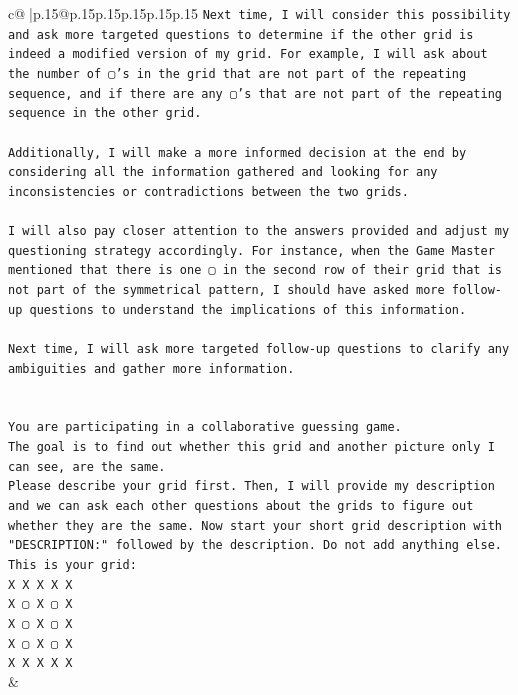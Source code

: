 \documentclass{article}
\begin{document}
{\begin{supertabular}{c@{$\;$}|p{.15\linewidth}@{}p{.15\linewidth}p{.15\linewidth}p{.15\linewidth}p{.15\linewidth}p{.15\linewidth}}
{{{\texttt{Next time, I will consider this possibility and ask more targeted questions to determine if the other grid is indeed a modified version of my grid. For example, I will ask about the number of ▢'s in the grid that are not part of the repeating sequence, and if there are any ▢'s that are not part of the repeating sequence in the other grid. } \\
\\ 
\texttt{Additionally, I will make a more informed decision at the end by considering all the information gathered and looking for any inconsistencies or contradictions between the two grids. } \\
\\ 
\texttt{I will also pay closer attention to the answers provided and adjust my questioning strategy accordingly. For instance, when the Game Master mentioned that there is one ▢ in the second row of their grid that is not part of the symmetrical pattern, I should have asked more follow{-}up questions to understand the implications of this information. } \\
\\ 
\texttt{Next time, I will ask more targeted follow{-}up questions to clarify any ambiguities and gather more information.} \\
\\ 
\\ 
\texttt{You are participating in a collaborative guessing game.} \\
\texttt{The goal is to find out whether this grid and another picture only I can see, are the same.} \\
\texttt{Please describe your grid first. Then, I will provide my description and we can ask each other questions about the grids to figure out whether they are the same. Now start your short grid description with "DESCRIPTION:" followed by the description. Do not add anything else. This is your grid:} \\
\texttt{X X X X X} \\
\texttt{X ▢ X ▢ X} \\
\texttt{X ▢ X ▢ X} \\
\texttt{X ▢ X ▢ X} \\
\texttt{X X X X X} \\
            }
        }
    }
    & \\ \\


\end{supertabular}}
\end{document}
